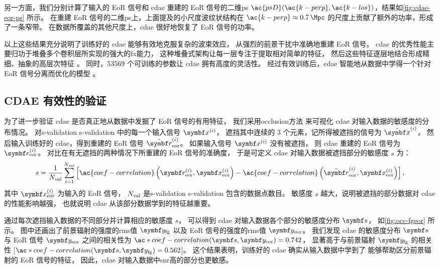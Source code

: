 另一方面，我们分别计算了输入的 EoR 信号和 \ac{cdae} 重建的 EoR 信号的二维\ac{ps}
$\ac{psD}(\ac{k-perp}, \ac{k-los})$，结果如\autoref{fig:cdae-eor-ps} 所示。
在重建 EoR 信号的二维\ac{ps}上，上面提及的小尺度波纹状结构在
$\ac{k-perp} \approx \SI{0.7}{\per\Mpc}$ 的尺度上贡献了额外的功率，形成了一条窄带。
在数据所覆盖的其他尺度上，\ac{cdae} 很好地恢复了 EoR 信号的功率。

以上这些结果充分说明了训练好的 \ac{cdae} 能够有效地克服复杂的波束效应，
从强烈的前景干扰中准确地重建 EoR 信号。
\ac{cdae} 的优秀性能主要归功于堆叠多个卷积层所实现的强大的\ac{fx}能力，
这种堆叠式架构让每一层专注于提取相对简单的特征，
然后这些特征逐层地结合形成精细、抽象的高层次特征 \cite{leCun2015}。
同时，\num{53569} 个可训练的参数让 \ac{cdae} 拥有高度的灵活性。
经过有效训练后，\ac{cdae} 智能地从数据中学得一个针对 EoR 信号分离而优化的模型
\cite{domingos2012}。

\subsection{CDAE 有效性的验证}
\label{sec:cdae-validation}

为了进一步验证 \ac{cdae} 是否真正地从数据中发掘了 EoR 信号的有用特征，
我们采用\ac{occlusion}方法\cite{zeiler2014}
来可视化 \ac{cdae} 对输入数据的敏感度的分布情况。
对\acl{s-validation} \ac{s-validation} 中的每一个输入信号 $\B{x}^{(i)}$，
遮挡其中连续的 3 个元素，记所得被遮挡的信号为 $\tilde{\B{x}}^{(i)}$，
然后输入训练好的 \ac{cdae}，得到重建的 EoR 信号 $\tilde{\B{r}}^{(i)}_{\R{eor}}$。
如果输入信号 $\B{x}^{(i)}$ 没有被遮挡，
则 \ac{cdae} 重建的 EoR 信号为 $\B{r}^{(i)}_{\R{eor}}$。
对比在有无遮挡的两种情况下所重建的 EoR 信号的准确度，
于是可定义 \ac{cdae} 对输入数据被遮挡部分的敏感度 $s$ 为：
\begin{equation}
  \label{eq:perf-loss}
  s = \frac{1}{N_{\R{val}}} \sum_{i=1}^{N_{\R{val}}} \left[
      \ac{coef-correlation} \left(
        \B{r}^{(i)}_{\R{eor}}, \B{x}^{(i)}_{\R{eor}}
      \right) -
      \ac{coef-correlation} \left(
        \tilde{\B{r}}^{(i)}_{\R{eor}}, \B{x}^{(i)}_{\R{eor}}
      \right)
    \right] ,
\end{equation}
其中 $\B{x}^{(i)}_{\R{eor}}$ 为输入的 EoR 信号，
$N_{\mathrm{val}}$ 是\acl{s-validation} \ac{s-validation} 包含的数据点数目。
敏感度 $s$ 越大，说明被遮挡的部分数据对 \ac{cdae} 的性能影响越强，
也就说明 \ac{cdae} 从该部分数据学到的特征越重要。

通过每次遮挡输入数据的不同部分并计算相应的敏感度 $s$，
可以得到 \ac{cdae} 对输入数据各个部分的敏感度分布 $\B{s}$，
如\autoref{fig:occ-fgeor} 所示。
图中还画出了前景辐射的强度的\acs*{rms}值 $\B{y}_{\R{fg}}$
以及 EoR 信号的强度的\acs*{rms}值 $\B{y}_{\R{eor}}$。
我们发现 \ac{cdae} 的敏感度分布 $\B{s}$ 与 EoR 信号 $\B{y}_{\R{eor}}$
之间的相关性为 $\ac*{coef-correlation}(\B{s}, \B{y}_{\R{eor}}) = 0.742$，
显著高于与前景辐射 $\B{y}_{\R{fg}}$ 的相关性
[$\ac*{coef-correlation}(\B{s}, \B{y}_{\R{fg}}) = 0.562$]。
这个结果表明，训练好的 \ac{cdae} 确实从输入数据中学到了
能够帮助区分前景辐射的 EoR 信号的特征，
因此，\ac{cdae} 对输入数据中\ac{snr}高的部分也更敏感。

